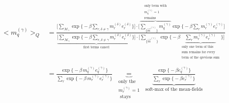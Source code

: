 \begin{equation}
	\begin{array}{ll}
	\big< m_q^{(\gamma)} \big>_Q
	& = \frac{ \Bigg[ \sum\limits_{\mathscr{M}_{\gamma}} \exp \Big\{ -\beta
		\sum\limits_{r, \delta \neq \gamma} m_{r}^{(\delta)}
		e_{r}^{(\delta)} \Big\} \Bigg] \cdot \Bigg[ 
		\overbrace{ \sum\limits_{ \big\{ \vec{m}^{(\gamma)} \big\} }
		m_q^{(\gamma)} }^{\substack{	\text{only term with} \\
						m_q^{(\gamma)} = 1 \\
						\text{remains} }}
		\exp \Big\{ -\beta \sum\limits_{r} m_{r}^{(\gamma)}
		e_{r}^{(\gamma)} \Bigg] }{
			\underbrace{
			\Bigg[ \sum\limits_{\mathscr{M}_{\gamma}} \exp 
			\Big\{ -\beta \sum\limits_{r, \delta \neq \gamma} 
			m_{r}^{(\delta)}e_{r}^{(\delta)} \Big\} \Bigg]
			}_{ \text{first terms cancel} } 
			\cdot \Bigg[ \sum\limits_{ \big\{ \vec{m}^{(\gamma)} 
			\big\} } \exp \Big\{ -\beta
			\underbrace{ \sum\limits_{r} m_{r}^{(\gamma)}
				e_{r}^{(\gamma)} }_{
				\substack{	\text{only one term of this} \\
						\text{sum remains for every} \\
						\text{term of the qrevious }
						\text{sum}} }
				\Big\} \Bigg] } \\\\
	 & = \frac{ \exp \big\{ -\beta\, m_q^{(\gamma)} e_q^{(\gamma)} \big\} }{
	 	\sum\limits_{r} \exp \big\{ -\beta \,
	 	m_{r}^{(\gamma)} e_{r}^{(\gamma)} \big\} }
	\; \underbrace{=}_{\substack{\text{only the } \\ m_r^{(\gamma)} = 1 \\\text{ stays}}} \; \underbrace{\frac{ \exp \big\{ -\beta e_q^{(\gamma)} \big\} }{
		\sum\limits_{r} \exp \big\{ -\beta 
		e_{r}^{(\gamma)} \big\} }}_{\text{soft-max of the mean-fields}}
	\end{array}
\end{equation}
